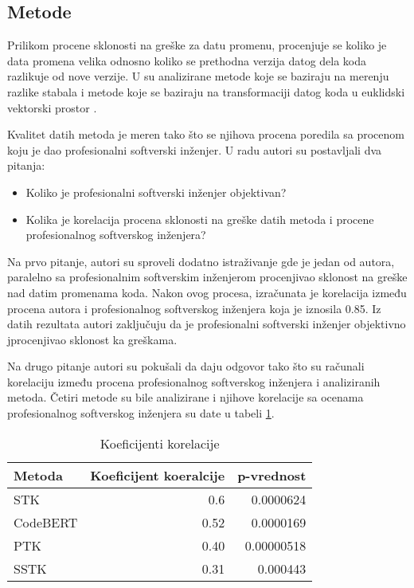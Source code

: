 \documentclass[twocolumns]{article}
\begin{document}
\begin{multicols}{2}
  \section{Metode}
  \label{sec:methods}
  
  Prilikom procene sklonosti na greške za datu promenu, procenjuje se koliko je data promena velika odnosno koliko se prethodna verzija datog dela koda razlikuje od nove verzije. U \cite{altiero2023ai} su analizirane metode koje se baziraju na merenju razlike stabala \cite{moschitti2006making} i metode koje se baziraju na transformaciji datog koda u euklidski vektorski prostor \cite{feng2020codebert}. 
  
  Kvalitet datih metoda je meren tako što se njihova procena poredila sa procenom koju je dao profesionalni softverski inženjer. U radu autori su postavljali dva pitanja:
  
  \begin{itemize}
    \item Koliko je profesionalni softverski inženjer objektivan?
    \item Kolika je korelacija procena sklonosti na greške datih metoda i procene profesionalnog softverskog inženjera?
  \end{itemize}
  
  
  Na prvo pitanje, autori su sproveli dodatno istraživanje gde je jedan od autora, paralelno sa profesionalnim softverskim inženjerom procenjivao sklonost na greške nad datim promenama koda. Nakon ovog procesa, izračunata je korelacija između procena autora i profesionalnog softverskog inženjera koja je iznosila 0.85. Iz datih rezultata autori zaključuju da je profesionalni softverski inženjer objektivno jprocenjivao sklonost ka greškama. 
  
  Na drugo pitanje autori su pokušali da daju odgovor tako što su računali korelaciju između procena profesionalnog softverskog inženjera i analiziranih metoda. Četiri metode su bile analizirane i njihove korelacije sa ocenama profesionalnog softverskog inženjera su date u tabeli \ref{fig:table1}.
  
  \begin{table}
    \begin{tabular}{l|r|r}
      Metoda & Koeficijent koeralcije & p-vrednost \\
      \hline
      STK        & 0.6 &0.0000624 \\
      CodeBERT   & 0.52&0.0000169 \\
      PTK        & 0.40    & 0.00000518         \\
      SSTK   &   0.31  & 0.000443         \\
      \hline
    \end{tabular}
    \label{fig:table1}
    \caption{Koeficijenti korelacije}
  \end{table}
  

\end{multicols}
\end{document}
